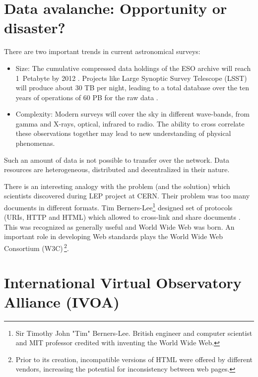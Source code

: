 \section{ Data avalanche: Opportunity or disaster?}

There are two important trends in current astronomical surveys:

\begin{itemize}

  \item{Size:} The cumulative compressed data holdings of the ESO archive will
    reach 1~Petabyte by 2012 \citep{hanisch2010international}. Projects
    like Large Synoptic Survey Telescope (LSST) will produce about 30
    TB per night, leading to a total database over the ten years of
    operations of 60 PB for the raw data \citep{becla2006designing}.
   
  \item{Complexity:} Modern surveys will cover the sky in different
    wave-bands, from gamma and X-rays, optical, infrared to radio. The
    ability to cross correlate these observations together may lead to
    new understanding of physical
    phenomenas. \citep{hanisch2010international}
\end{itemize}



\noindent Such an amount of data is not possible to transfer over the
network. Data resources are heterogeneous, distributed and
decentralized in their nature.


There is an interesting analogy with the problem (and the solution)
which scientists discovered during LEP project at CERN.  Their problem
was too many documents in different formats. Tim Berners-Lee\footnote{
  Sir Timothy John "Tim" Berners-Lee. British engineer and computer
  scientist and MIT professor credited with inventing the World Wide
  Web.} designed set of protocols (URIs, HTTP and HTML) which allowed
to cross-link and share documents
\citep{berners1990worldwideweb}. This was recognized as generally
useful and World Wide Web was born. An important role in developing
Web standards plays the World Wide Web Consortium
(W3C)\,\footnote{Prior to its creation, incompatible versions of HTML
  were offered by different vendors, increasing the potential for
  inconsistency between web pages.}.
    
    
\section{International Virtual Observatory Alliance (IVOA)}

